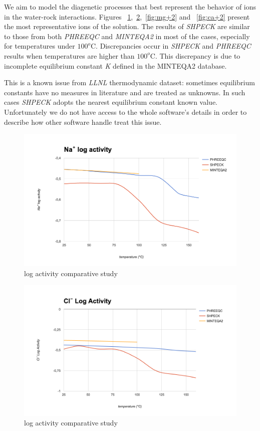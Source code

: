 \documentclass[preprint,12pt,3p]{elsarticle}
\begin{document}
We aim to model the diagenetic processes that best represent the behavior of ions in the water-rock interactions. Figures ~\ref{fig:na+},~\ref{fig:cl-},~\ref{fig:mg+2} and ~\ref{fig:ca+2} present the most representative ions of the solution. The results of \emph{SHPECK} are similar to those from both \emph{PHREEQC} and \emph{MINTEQA2} in most of the cases, especially for temperatures under $100^o$C. Discrepancies occur in \emph{SHPECK} and \emph{PHREEQC} results when temperatures are higher than $100^o$C. This discrepancy is due to incomplete equilibrium constant \emph{K} defined in the MINTEQA2 database.

This is a known issue from \emph{LLNL} thermodynamic dataset: sometimes equilibrium constants have no measures in literature and are treated as unknowns. In such cases \emph{SHPECK} adopts the nearest equilibrium constant known value. Unfortunately we do not have access to the whole software’s details in order to describe how other software handle treat this issue.

\begin{figure}[ht!]
\centering
\includegraphics[width=140mm]{na+.png}
\caption{ log activity comparative study}
\label{fig:na+}
\end{figure}

\begin{figure}[ht!]
\centering
\includegraphics[width=140mm]{cl-.png}
\caption{ log activity comparative study}
\label{fig:cl-}
\end{figure}
\end{document}
